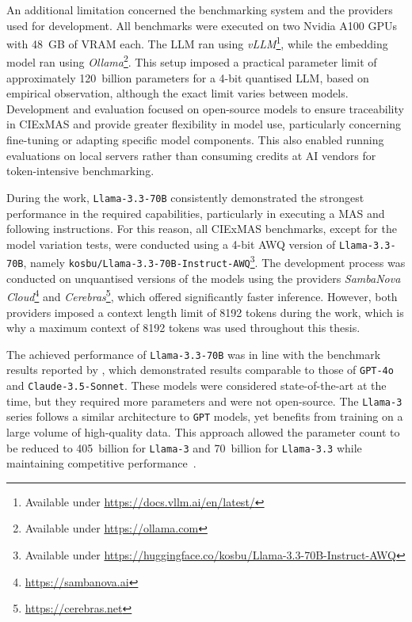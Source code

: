 \documentclass[a4paper,oneside,bibliography=totoc]{scrbook}
\begin{document}
An additional limitation concerned the benchmarking system and the providers used for development. All benchmarks were executed on two Nvidia A100 GPUs with 48~GB of VRAM each. The \ac{LLM} ran using \textit{vLLM}\footnote{Available under \url{https://docs.vllm.ai/en/latest/}}, while the embedding model ran using \textit{Ollama}\footnote{Available under \url{https://ollama.com}}. This setup imposed a practical parameter limit of approximately 120~billion parameters for a 4-bit quantised \ac{LLM}, based on empirical observation, although the exact limit varies between models. Development and evaluation focused on open-source models to ensure traceability in CIExMAS and provide greater flexibility in model use, particularly concerning fine-tuning or adapting specific model components. This also enabled running evaluations on local servers rather than consuming credits at AI vendors for token-intensive benchmarking.

During the work, \texttt{Llama-3.3-70B} consistently demonstrated the strongest performance in the required capabilities, particularly in executing a \ac{MAS} and following instructions. For this reason, all CIExMAS benchmarks, except for the model variation tests, were conducted using a 4-bit AWQ version of \texttt{Llama-3.3-70B}, namely \texttt{kosbu/Llama-3.3-70B-Instruct-AWQ}\footnote{Available under \url{https://huggingface.co/kosbu/Llama-3.3-70B-Instruct-AWQ}}. The development process was conducted on unquantised versions of the models using the providers \textit{SambaNova Cloud}\footnote{\url{https://sambanova.ai}} and \textit{Cerebras}\footnote{\url{https://cerebras.net}}, which offered significantly faster inference. However, both providers imposed a context length limit of 8192 tokens during the work, which is why a maximum context of 8192 tokens was used throughout this thesis.

The achieved performance of \texttt{Llama-3.3-70B} was in line with the benchmark results reported by \citet{Meta2024}, which demonstrated results comparable to those of \texttt{GPT-4o} and \texttt{Claude-3.5-Sonnet}. These models were considered state-of-the-art at the time, but they required more parameters and were not open-source. The \texttt{Llama-3} series follows a similar architecture to \texttt{GPT} models, yet benefits from training on a large volume of high-quality data. This approach allowed the parameter count to be reduced to 405~billion for \texttt{Llama-3} and 70~billion for \texttt{Llama-3.3} while maintaining competitive performance~\cite{Grattafiori2024,Meta2024}.
\end{document}
